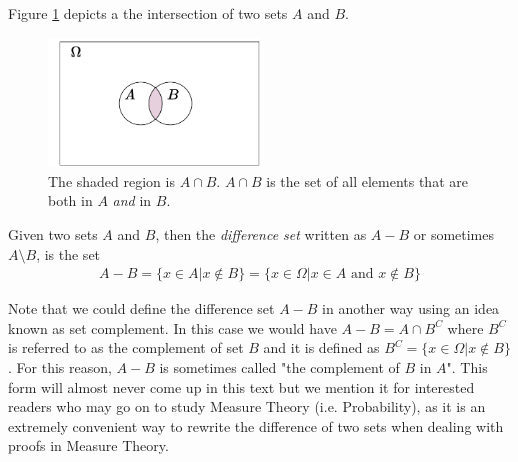 \noindent Figure \ref{fig:set_intersection_example} depicts a the intersection of two sets $A$ and $B$.
\begin{figure}[h!]
    \centering
    \includegraphics[width=0.5\textwidth]{Figures/Set_INTERSECTION.pdf}
    \caption{The shaded region is $A\cap B$. $A\cap B$ is the set of all elements that are both in $A$ \textit{and} in $B$.}
    \label{fig:set_intersection_example}
\end{figure}

\begin{definition}
Given two sets $A$ and $B$, then the \textit{difference set} written as $A - B$ or sometimes $A\setminus B$, is the set
\begin{align}
    A-B=\{x\in A| x\not\in B\}=\{x\in \Omega |x\in A \text{ and } x\not\in B \} \nonumber
\end{align}
\end{definition}
Note that we could define the difference set $A- B$ %
in another way using an idea known as set complement. In this case we would have $A- B=A\cap B^C$ where $B^C$ is referred to as the complement of set $B$ and it is defined as $B^C=\{x\in \Omega| x\not \in B\}$. For this reason, $A-B$ is sometimes called "the complement of $B$ in $A$". This form will almost never come up in this text but we mention it for interested readers who may go on to study Measure Theory (i.e. Probability), as it is an extremely convenient way to rewrite the difference of two sets when dealing with proofs in Measure Theory. 

